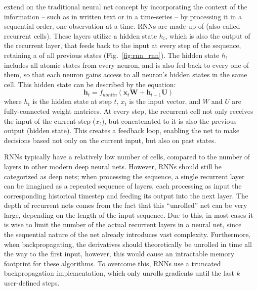 			 extend on the traditional neural net concept by incorporating the  context of the information -- such as in written text or in a time-series -- by processing it in a sequential order, one observation at a time.
			\acp{RNN} are made up of  (also called recurrent cells).
			These layers utilize a hidden state $h_t$, which is also the output of the recurrent layer, that feeds back to the input at every step of the sequence, retaining a  of all previous states (Fig.~\ref{fig:rnn_rnn}). 
			The hidden state $h_t$ includes all atomic states from every neuron, and is also fed back to every one of them, so that each neuron gains access to all neuron’s hidden states in the same cell. This hidden state can be described by the equation:
			\begin{equation}
				\mathbf{h}_t = f_{nonlin}(\mathbf{x}_t\mathbf{W} + \mathbf{h}_{t-1}\mathbf{U})
			\end{equation}
			\noindent where $h_t$ is the hidden state at step $t$, $x_t$ is the input vector, and $W$ and $U$ are fully-connected weight matrices.
			At every step, the recurrent cell not only receives the input of the current step ($x_t$), but concatenated to it is also the previous output (hidden state).
			This creates a feedback loop, enabling the net to make decisions based not only on the current input, but also on past states.
			
			\acp{RNN} typically have a relatively low number of cells, compared to the number of layers in other modern deep neural nets.
			However, \acp{RNN} should still be categorized as deep nets; when processing the sequence, a single recurrent layer can be imagined as a repeated sequence of layers, each processing as input the corresponding historical timestep and feeding its output into the next layer.
			The depth of recurrent nets comes from the fact that this “unrolled” net can be very large, depending on the length of the input sequence.
			Due to this, in most cases it is wise to limit the number of the actual recurrent layers in a neural net, since the sequential nature of the net already introduces vast complexity.
			Furthermore, when backpropagating, the derivatives should theoretically be unrolled in time all the way to the first input, however, this would cause an intractable memory footprint for these algorithms.
			To overcome this, \acp{RNN} use a truncated backpropagation implementation, which only unrolls gradients until the last $k$ user-defined steps.
			
